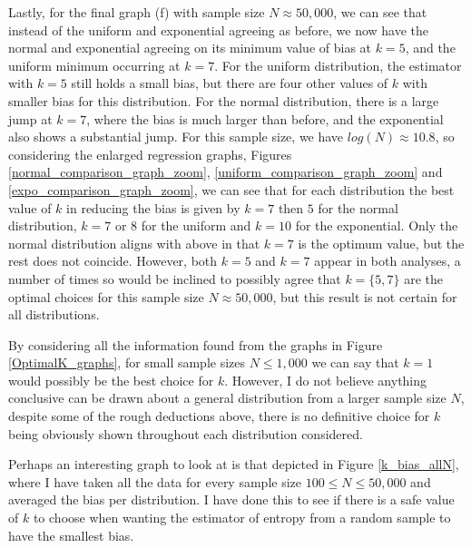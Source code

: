 \documentclass[12pt]{report}
\begin{document}
Lastly, for the final graph (f) with sample size $N \approx 50,000$, we can see that instead of the uniform and exponential agreeing as before, we now have the normal and exponential agreeing on its minimum value of bias at $k=5$, and the uniform minimum occurring at $k=7$. For the uniform distribution, the estimator with $k=5$ still holds a small bias, but there are four other values of $k$ with smaller bias for this distribution. For the normal distribution, there is a large jump at $k=7$, where the bias is much larger than before, and the exponential also shows a substantial jump. For this sample size, we have $log(N) \approx 10.8$, so considering the enlarged regression graphs, Figures \ref{normal_comparison_graph_zoom}, \ref{uniform_comparison_graph_zoom} and \ref{expo_comparison_graph_zoom}, we can see that for each distribution the best value of $k$ in reducing the bias is given by $k=7$ then $5$ for the normal distribution, $k=7$ or $8$ for the uniform and $k=10$ for the exponential. Only the normal distribution aligns with above in that $k=7$ is the optimum value, but the rest does not coincide. However, both $k=5$ and $k=7$ appear in both analyses, a number of times so would be inclined to possibly agree that $k= \{5, 7\}$ are the optimal choices for this sample size $N \approx 50,000$, but this result is not certain for all distributions. 


By considering all the information found from the graphs in Figure \ref{OptimalK_graphs}, for small sample sizes $N \leq 1,000$ we can say that $k=1$ would possibly be the best choice for $k$. However, I do not believe anything conclusive can be drawn about a general distribution from a larger sample size $N$, despite some of the rough deductions above, there is no definitive choice for $k$ being obviously shown throughout each distribution considered. 

Perhaps an interesting graph to look at is that depicted in Figure \ref{k_bias_allN}, where I have taken all the data for every sample size $100 \leq N \leq 50,000$ and averaged the bias per distribution. I have done this to see if there is a safe value of $k$ to choose when wanting the estimator of entropy from a random sample to have the smallest bias.
\end{document}
